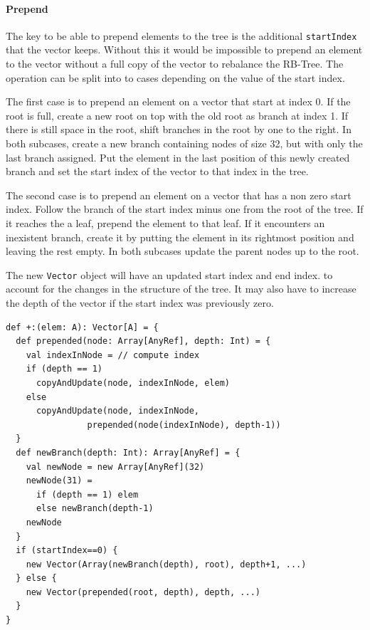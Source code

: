 \paragraph{Prepend}
The key to be able to prepend  elements to the tree is the additional \texttt{startIndex} that the vector keeps. Without this it would be impossible to prepend an element to the vector without a full copy of the vector to rebalance the RB-Tree. The operation can be split into to cases depending on the value of the start index.

The first case is to prepend an element on a vector that start at index 0. If the root is full, create a new root on top with the old root as branch at index 1. If there is still space in the root, shift branches in the root by one to the right. In both sub\-cases, create a new branch containing nodes of size 32, but with only the last branch assigned. Put the element in the last position of this newly created branch and set the start index of the vector to that index in the tree.

The second case is to prepend an element on a vector that has a non zero start index. Follow the branch of the start index minus one from the root of the tree. If it reaches the a leaf, prepend the element to that leaf. If it encounters an inexistent branch, create it by putting the element in its rightmost position and leaving the rest empty. In both sub\-cases update the parent nodes up to the root.

The new \texttt{Vector} object will have an updated start index and end index. to account for the changes in the structure of the tree. It may also have to increase the depth of the vector if the start index was previously zero. 

\begin{lstlisting}[frame=single]
def +:(elem: A): Vector[A] = {
  def prepended(node: Array[AnyRef], depth: Int) = {
    val indexInNode = // compute index
    if (depth == 1) 
      copyAndUpdate(node, indexInNode, elem)
    else 
      copyAndUpdate(node, indexInNode, 
                prepended(node(indexInNode), depth-1))
  }
  def newBranch(depth: Int): Array[AnyRef] = {
    val newNode = new Array[AnyRef](32)
    newNode(31) = 
      if (depth == 1) elem 
      else newBranch(depth-1)
    newNode
  }
  if (startIndex==0) {
    new Vector(Array(newBranch(depth), root), depth+1, ...)
  } else {
    new Vector(prepended(root, depth), depth, ...)  
  }
}
\end{lstlisting}

